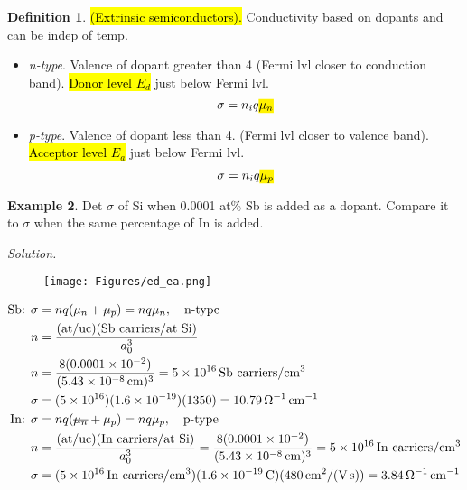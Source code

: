 \documentclass{article}
\theoremstyle{definition}
\newtheorem{definition}{Definition}[section]
\newtheorem{example}[definition]{Example}
\newcommand{\stkout}[1]{\ifmmode\text{\sout{\ensuremath{#1}}}\else\sout{#1}\fi}
\begin{document}
\begin{definition}
    \hl{(Extrinsic semiconductors).} Conductivity based on dopants and can be indep of temp.
    \begin{itemize}
        \item \textit{n-type}. Valence of dopant greater than 4 (Fermi lvl closer to conduction band). \hl{Donor level $E_d$} just below Fermi lvl. 
        \begin{equation}
            \sigma = n_i q \text{\hl{$\mu_n$}}
        \end{equation}
        \item \textit{p-type}. Valence of dopant less than 4. (Fermi lvl closer to valence band). \hl{Acceptor level $E_a$} just below Fermi lvl.
        \begin{equation}
            \sigma = n_i q \text{\hl{$\mu_p$}}
        \end{equation}
    \end{itemize}
\end{definition}

\begin{example}
    Det $\sigma$ of Si when 0.0001 at\% Sb is added as a dopant. Compare it to $\sigma$ when the same percentage of In is added.

    \textit{Solution.} \vspace{-1em}
    \begin{figure}[ht]
        \centering
        \texttt{[image: Figures/ed\_ea.png]}
    \end{figure} \vspace{-2em}
    \begin{align*}
        \text{Sb: } \sigma &= nq(\mu_n + \stkout{\mu_p}) = nq \mu_n, \quad \text{n-type} \\
        n &= \frac{(\text{at/uc}) (\text{Sb carriers/at Si})}{a_0^3} \\
        n &= \frac{8 (0.0001 \times 10^{-2})}{(\SI{5.43e-8}{cm})^3} = \SI{5e16}{Sb\ carriers/cm^3} \\
        \sigma &= (5 \times 10^{16}) (1.6 \times 10^{-19}) (1350) = \SI{10.79}{\ohm^{-1}.cm^{-1}} \\
        \text{In: } \sigma &= nq(\stkout{\mu_n} + \mu_p) = nq \mu_p, \quad \text{p-type} \\
        n &= \frac{(\text{at/uc}) (\text{In carriers/at Si})}{a_0^3} = \frac{8 (0.0001 \times 10^{-2})}{(\SI{5.43e-8}{cm})^3} = \SI{5e16}{In\ carriers/cm^3} \\
        \sigma &= (\SI{5e16}{In\ carriers/cm^3}) (\SI{1.6e-19}{C}) (\SI{480}{cm^2/(V.s)}) = \SI{3.84}{\ohm^{-1}.cm^{-1}}
    \end{align*}
\end{example}
\end{document}
